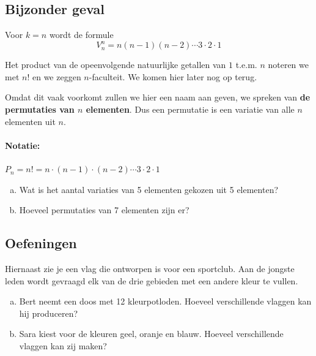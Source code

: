 \documentclass[12pt,twoside]{article}
\begin{document}
\subsection{Bijzonder geval}

Voor $k=n$ wordt de formule
$$V^n_n=n(n-1)(n-2)\cdots 3\cdot 2 \cdot 1$$

Het product van de opeenvolgende natuurlijke getallen van $1$ t.e.m. $n$ noteren we met $n!$ en we zeggen $n$-faculteit. We komen hier later nog op terug.

Omdat dit vaak voorkomt zullen we hier een naam aan geven, we spreken van {\bf de permutaties van $n$ elementen}. Dus een permutatie is een variatie van alle $n$ elementen uit $n$.

\paragraph*{Notatie:} $P_n=n!=n\cdot(n-1)\cdot(n-2)\cdots 3\cdot 2\cdot 1$

\begin{oefening}
\begin{enumerate}[(a)]
  \item Wat is het aantal variaties van 5 elementen gekozen uit 5 elementen?
  \item Hoeveel permutaties van 7 elementen zijn er?
\end{enumerate}
\end{oefening}

\subsection{Oefeningen}

\begin{minipage}{0.7\textwidth}
\begin{oefening}
Hiernaast zie je een vlag die ontworpen is voor een sportclub. Aan de jongste leden wordt gevraagd elk van de drie gebieden met een andere kleur te vullen.
\begin{enumerate}[(a)]
  \item Bert neemt een doos met 12 kleurpotloden. Hoeveel verschillende vlaggen kan hij produceren?
  \item Sara kiest voor de kleuren geel, oranje en blauw. Hoeveel verschillende vlaggen kan zij maken?
\end{enumerate}
\end{oefening}
\end{minipage}
\begin{minipage}{0.25\textwidth}
\end{minipage}
\end{document}
